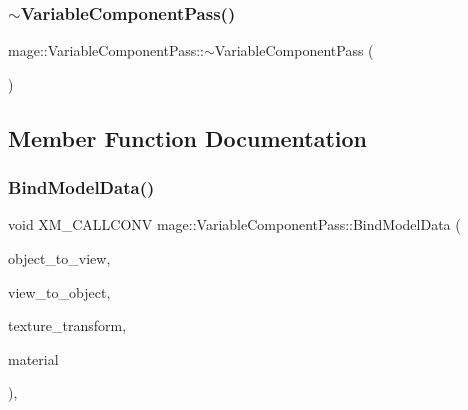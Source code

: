\hypertarget{classmage_1_1_variable_component_pass_addf03c307a88e6a1871f0ec3adbb8bcb}{}\label{classmage_1_1_variable_component_pass_addf03c307a88e6a1871f0ec3adbb8bcb} 
\subsubsection{\texorpdfstring{$\sim$\+Variable\+Component\+Pass()}{~VariableComponentPass()}}
{\footnotesize\ttfamily mage\+::\+Variable\+Component\+Pass\+::$\sim$\+Variable\+Component\+Pass (\begin{DoxyParamCaption}{ }\end{DoxyParamCaption})\hspace{0.3cm}{\ttfamily [default]}}



\subsection{Member Function Documentation}
\hypertarget{classmage_1_1_variable_component_pass_aefb199dd54c4701cd1e449592fe61cf9}{}\label{classmage_1_1_variable_component_pass_aefb199dd54c4701cd1e449592fe61cf9} 
\subsubsection{\texorpdfstring{Bind\+Model\+Data()}{BindModelData()}}
{\footnotesize\ttfamily void X\+M\+\_\+\+C\+A\+L\+L\+C\+O\+NV mage\+::\+Variable\+Component\+Pass\+::\+Bind\+Model\+Data (\begin{DoxyParamCaption}\item[{F\+X\+M\+M\+A\+T\+R\+IX}]{object\+\_\+to\+\_\+view,  }\item[{F\+X\+M\+M\+A\+T\+R\+IX}]{view\+\_\+to\+\_\+object,  }\item[{F\+X\+M\+M\+A\+T\+R\+IX}]{texture\+\_\+transform,  }\item[{const \hyperlink{structmage_1_1_material}{Material} $\ast$}]{material }\end{DoxyParamCaption})\hspace{0.3cm}{\ttfamily [private]}, {\ttfamily [noexcept]}}


